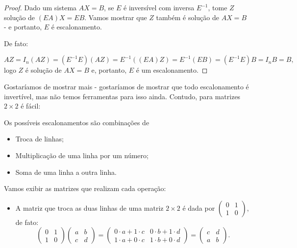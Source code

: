 \begin{proof}
	Dado um sistema $AX=B$, se $E$ é inversível com inversa $E^{-1}$, tome $Z$ solução de $(EA)X=EB$. Vamos mostrar que $Z$ também é solução de $AX=B$ - e portanto, $E$ é escalonamento.
	
	De fato:
	
	\[AZ=I_n(AZ)=(E^{-1}E)(AZ)=E^{-1}((EA)Z)=E^{-1}(EB)=(E^{-1}E)B=I_nB=B,\]logo $Z$ é solução de $AX=B$ e, portanto, $E$ é um escalonamento.
\end{proof}

Gostaríamos de mostrar mais - gostaríamos de mostrar que todo escalonamento é invertível, mas não temos ferramentas para isso ainda. Contudo, para matrizes $2\times 2$ é fácil:

\begin{ex}
	Os possíveis escalonamentos são combinações de 
	\begin{itemize}
		\item Troca de linhas;
		\item Multiplicação de uma linha por um número;
		\item Soma de uma linha a outra linha.
	\end{itemize}

	Vamos exibir as matrizes que realizam cada operação:
	
	\begin{itemize}
		\item A matriz que troca as duas linhas de uma matriz $2\times 2$ é dada por $\begin{pmatrix}
		0&1\\1&0
		\end{pmatrix}$, de fato:
		\[\begin{pmatrix}
		0&1\\1&0
		\end{pmatrix}\begin{pmatrix}
		a&b\\c&d
		\end{pmatrix}=\begin{pmatrix}
		0\cdot a+1\cdot c&0\cdot b+1\cdot d\\
		1\cdot a+0\cdot c&1\cdot b+0\cdot d
		\end{pmatrix}=\begin{pmatrix}
		c&d\\a&b
		\end{pmatrix}.\]
		

\end{itemize}
\end{ex}
